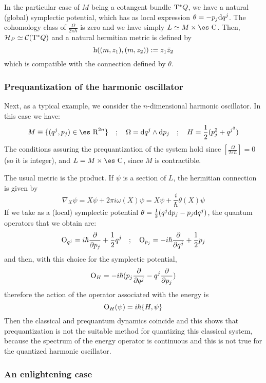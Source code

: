 \documentclass[12pt]{article}
\def\derpar#1#2{\frac{\partial{#1}}{\partial{#2}}}
\def\d{{\rm d}}
\def\C{{\cal C}}
\def\H{{\cal H}}
\def\Op{{\rm O}}
\def\h{{\rm h}}
\def\Real{\mbox{\es R}}
\def\Complex{\mbox{\es C}}
\def\Tan{{\rm T}}
\begin{document}
In the particular case of $M$ being a cotangent bundle $\Tan^*Q$,
we have a natural (global) symplectic potential,
which has as local expression
$\theta = -p_j\d q^j$.
The cohomology class of $\frac{\Omega}{2\pi\hbar}$ is zero and we have
simply
$L \simeq M \times \Complex$.
Then, $\H_P \simeq \C (\Tan^*Q)$
and a natural hermitian metric is defined by
$$
\h ((m,z_1),(m,z_2)) := z_1 \bar z_2
$$
which is compatible with the connection defined by $\theta$.


\subsubsection{Prequantization of the harmonic oscillator}


Next, as a typical example, we consider
the $n$-dimensional harmonic oscillator. In this case we have:
$$
M \equiv \{ (q^j,p_j) \in \Real^{2n} \}
\quad ; \quad
\Omega = \d q^j \wedge \d p_j
\quad ; \quad
H = \frac{1}{2}(p_j^2 + q^{j^2})
$$
The conditions assuring the prequantization of the system hold since
$[\frac{\Omega}{2\pi\hbar}]=0$ (so it is integer), and
$L = M \times \Complex$, since $M$ is contractible.

The usual metric is the product.
If $\psi$ is a section of $L$,
the hermitian connection is given by
$$
\nabla_X\psi = X\psi + 2\pi i \omega (X) \psi =
X\psi + \frac{i}{\hbar} \theta (X) \psi
$$
If we take as a (local) symplectic potential
$\theta = \frac{1}{2}(q^j\d p_j -p_j\d q^j)$,
the quantum operators that we obtain are:
$$
\Op_{q^j} = i\hbar \derpar{}{p_j} + \frac{1}{2} q^j
\quad ; \quad
\Op_{p_j} = -i\hbar \derpar{}{q^j} + \frac{1}{2} p_j
$$
and then, with this choice for the symplectic potential,
$$
\Op_H = -i\hbar (p_j\derpar{}{q^j} - q^j\derpar{}{p_j})
$$
therefore the action of the operator associated with the energy is
$$
\Op_H (\psi ) = i\hbar \{ H,\psi \}
$$
Then the classical and prequantum dynamics coincide
and this shows that prequantization is not
the suitable method for quantizing this classical system,
because the spectrum of the energy operator is continuous
and this is not true for the quantized harmonic oscillator.


\subsubsection{An enlightening case}
\end{document}
